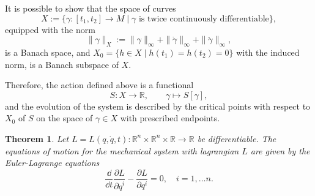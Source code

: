 \documentclass[english,fontsize=11pt,paper=b5]{scrbook}
\newtheorem{theorem}{Theorem}[chapter]
\theoremstyle{definition}
\begin{document}
  It is possible to show that the space of curves
  \begin{equation}
    X := \big\{ \gamma: [t_1, t_2] \to M \mid \gamma \mbox{ is twice continuously differentiable}\big\},
  \end{equation} equipped with the norm
  \begin{equation}
    \|\gamma\|_X :=
    \|\gamma\|_\infty + \|\dot \gamma\|_\infty + \|\ddot \gamma\|_\infty,
  \end{equation}
  is a Banach space, and $X_0 = \big\{h\in X \mid h(t_1) = h(t_2) = 0\big\}$ with the induced norm, is a Banach subspace of $X$.

  Therefore, the action defined above is a functional
  \begin{equation}
    S : X \to \mathbb{R},\qquad \gamma \mapsto S[\gamma],
  \end{equation}
  and the evolution of the system is described by the critical points with respect to $X_0$ of $S$ on the space of $\gamma \in X$ with prescribed endpoints.

  \begin{theorem}
    Let $L = L(q, \dot q, t) : \mathbb{R}^{n}\times \mathbb{R}^{n}\times \mathbb{R} \to \mathbb{R}$ be differentiable.
    The equations of motion for the mechanical system with lagrangian $L$ are given by the \emph{Euler-Lagrange equations}
    \begin{equation}\label{eq:eulerlagrange}
      \frac{\dd}{\dd t}\frac{\partial L}{\partial \dot q^i} - \frac{\partial L}{\partial q^i} = 0, \quad i=1,\ldots n.
    \end{equation}
  \end{theorem}
\end{document}
